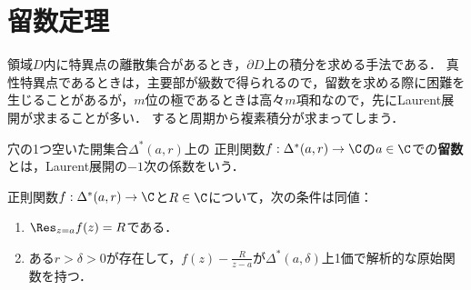 \documentclass[uplatex, dvipdfmx]{jsreport}
\begin{document}
\section{留数定理}

\begin{tcolorbox}[colframe=ForestGreen, colback=ForestGreen!10!white,breakable,colbacktitle=ForestGreen!40!white,coltitle=black,fonttitle=\bfseries\sffamily,
title=]
    領域$D$内に特異点の離散集合があるとき，$\partial D$上の積分を求める手法である．
    真性特異点であるときは，主要部が級数で得られるので，留数を求める際に困難を生じることがあるが，$m$位の極であるときは高々$m$項和なので，先にLaurent展開が求まることが多い．
    すると周期から複素積分が求まってしまう．
\end{tcolorbox}

\begin{definition}[residue]
    穴の1つ空いた開集合$\Delta^*(a,r)$上の
    正則関数$f:\Delta^*(a,r)\to\C$の$a\in\C$での\textbf{留数}とは，Laurent展開の$-1$次の係数をいう．
\end{definition}

\begin{proposition}[留数の特徴付け]
    正則関数$f:\Delta^*(a,r)\to\C$と$R\in\C$について，次の条件は同値：
    \begin{enumerate}
        \item $\Res_{z=a}f(z)=R$である．
        \item 
        ある$r>\delta>0$が存在して，$f(z)-\frac{R}{z-a}$が$\Delta^*(a,\delta)$上1価で解析的な原始関数を持つ．
    \end{enumerate}
\end{proposition}
\end{document}
